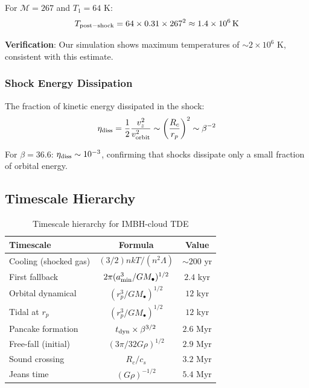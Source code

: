 \documentclass[twocolumn,amsmath,amssymb,prd,superscriptaddress,nofootinbib]{revtex4-2}
\begin{document}
For $\mathcal{M} = 267$ and $T_1 = 64$ K:
\begin{equation}
    T_{\rm post-shock} = 64 \times 0.31 \times 267^2 \approx 1.4 \times 10^6\,{\rm K}
\end{equation}

\textbf{Verification}: Our simulation shows maximum temperatures of $\sim 2 \times 10^6$ K, consistent with this estimate.

\subsubsection{Shock Energy Dissipation}

The fraction of kinetic energy dissipated in the shock:
\begin{equation}
    \eta_{\rm diss} = \frac{1}{2} \frac{v_z^2}{v_{\rm orbit}^2} \sim \left(\frac{R_c}{r_p}\right)^2 \sim \beta^{-2}
    \label{eq:eta_diss}
\end{equation}

For $\beta = 36.6$: $\eta_{\rm diss} \sim 10^{-3}$, confirming that shocks dissipate only a small fraction of orbital energy.

\subsection{Timescale Hierarchy}
\label{sec:timescale_hierarchy}

\begin{table}[h]
\centering
\caption{Timescale hierarchy for IMBH-cloud TDE}
\label{tab:timescales}
\begin{tabular}{lcc}
\toprule
Timescale & Formula & Value \\
\midrule
Cooling (shocked gas) & $(3/2)nkT/(n^2\Lambda)$ & $\sim 200$ yr \\
First fallback & $2\pi(a_{\rm min}^3/GM_\bullet)^{1/2}$ & $2.4$ kyr \\
Orbital dynamical & $(r_p^3/GM_\bullet)^{1/2}$ & $12$ kyr \\
Tidal at $r_p$ & $(r_p^3/GM_\bullet)^{1/2}$ & $12$ kyr \\
Pancake formation & $t_{\rm dyn} \times \beta^{3/2}$ & $2.6$ Myr \\
Free-fall (initial) & $(3\pi/32G\rho)^{1/2}$ & $2.9$ Myr \\
Sound crossing & $R_c/c_s$ & $3.2$ Myr \\
Jeans time & $(G\rho)^{-1/2}$ & $5.4$ Myr \\
\bottomrule
\end{tabular}
\end{table}
\end{document}
